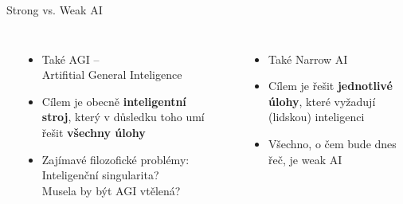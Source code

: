 \documentclass[aspectratio=169,dvipsnames]{beamer}
\begin{document}
\begin{frame}{Strong vs. Weak AI}

    \begin{columns}[t]
        \begin{center}
        \end{center}

        \vspace{5pt}

        \begin{itemize}

            \item<2-> Také AGI -- \\ \quad Artifitial General Inteligence

            \item<3-> Cílem je obecně \textbf{inteligentní stroj}, který v důsledku
			    toho umí řešit \textbf{všechny úlohy}

            \item<4-> Zajímavé filozofické problémy: \\ Inteligenční singularita?
                \\ Musela by být AGI vtělená?

        \end{itemize}


        \begin{center}
        \end{center}

        \vspace{5pt}

        \begin{itemize}

            \item<6-> Také Narrow AI

            \item<7-> Cílem je řešit \textbf{jednotlivé úlohy}, které vyžadují
					(lidskou) inteligenci

            \item<8-> Všechno, o čem bude dnes řeč, je weak AI

        \end{itemize}

		\vspace{15pt}


    \end{columns}


\end{frame}
\end{document}
